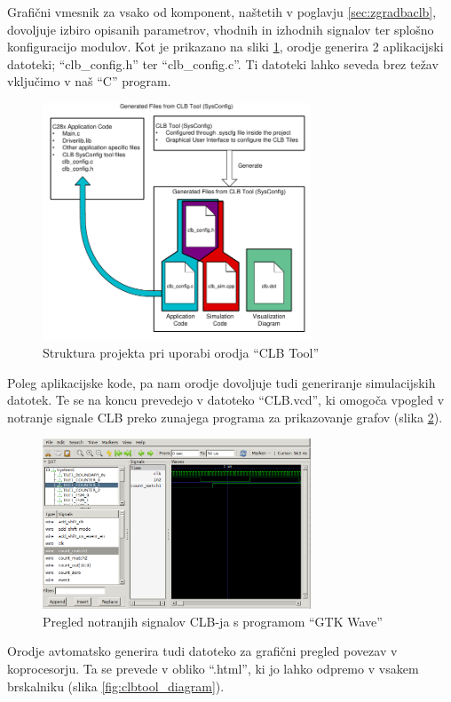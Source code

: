 \documentclass[a4paper]{article}
\begin{document}
Grafični vmesnik za vsako od komponent, naštetih v poglavju \ref{sec:zgradbaclb}, dovoljuje izbiro opisanih parametrov, vhodnih in izhodnih signalov ter splošno konfiguracijo modulov. Kot je prikazano na sliki \ref{fig:clbtool_struktura}, orodje generira 2 aplikacijski datoteki; ``clb\_config.h'' ter ``clb\_config.c''. Ti datoteki lahko seveda brez težav vključimo v naš ``C'' program.

\begin{figure}[htb]
    \centerline{\includegraphics[width=8cm]{clbtool_struktura}}
    \caption{Struktura projekta pri uporabi orodja ``CLB Tool'' \cite[Pogl.~1]{clb-user-guide}}
    \label{fig:clbtool_struktura} 
\end{figure} 

Poleg aplikacijske kode, pa nam orodje dovoljuje tudi generiranje simulacijskih datotek. Te se na koncu prevedejo v datoteko ``CLB.vcd'', ki omogoča vpogled v notranje signale CLB preko zunajega programa za prikazovanje grafov (slika \ref{fig:clbtool_simulacija}).

\begin{figure}[htb]
    \centerline{\includegraphics[width=8cm]{gtkwave}}
    \caption{Pregled notranjih signalov CLB-ja s programom ``GTK Wave''}
    \label{fig:clbtool_simulacija} 
\end{figure} 

Orodje avtomatsko generira tudi datoteko za grafični pregled povezav v koprocesorju. Ta se prevede v obliko ``.html'', ki jo lahko odpremo v vsakem brskalniku (slika \ref{fig:clbtool_diagram})\cite[Pogl.~1]{clb-user-guide}.
\end{document}
